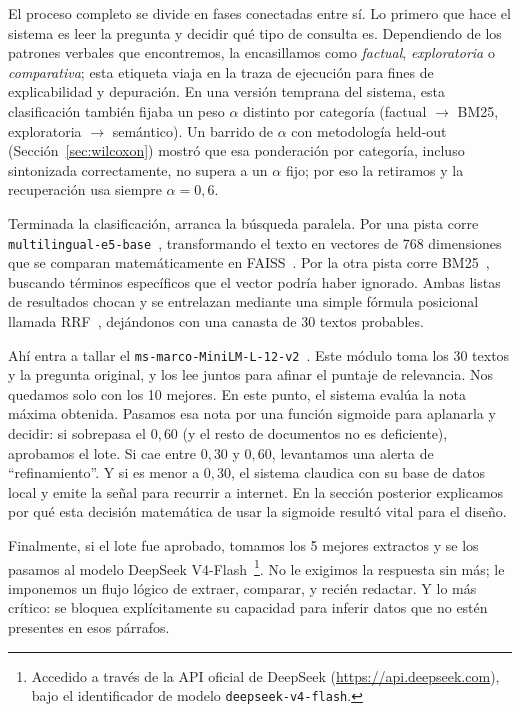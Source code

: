 \documentclass[runningheads]{llncs}
\begin{document}
El proceso completo se divide en fases conectadas entre s\'{i}. Lo primero que hace el sistema es leer la pregunta y decidir qu\'{e} tipo de consulta es. Dependiendo de los patrones verbales que encontremos, la encasillamos como \textit{factual}, \textit{exploratoria} o \textit{comparativa}; esta etiqueta viaja en la traza de ejecuci\'{o}n para fines de explicabilidad y depuraci\'{o}n. En una versi\'{o}n temprana del sistema, esta clasificaci\'{o}n tambi\'{e}n fijaba un peso $\alpha$ distinto por categor\'{i}a (factual $\rightarrow$ BM25, exploratoria $\rightarrow$ sem\'{a}ntico). Un barrido de $\alpha$ con metodolog\'{i}a held-out (Secci\'{o}n~\ref{sec:wilcoxon}) mostr\'{o} que esa ponderaci\'{o}n por categor\'{i}a, incluso sintonizada correctamente, no supera a un $\alpha$ fijo; por eso la retiramos y la recuperaci\'{o}n usa siempre $\alpha{=}0{,}6$.

Terminada la clasificaci\'{o}n, arranca la b\'{u}squeda paralela. Por una pista corre \texttt{multilingual-e5-base}~\cite{wang2024e5}, transformando el texto en vectores de 768 dimensiones que se comparan matem\'{a}ticamente en FAISS~\cite{johnson2021billion}. Por la otra pista corre BM25~\cite{robertson2009bm25}, buscando t\'{e}rminos espec\'{i}ficos que el vector podr\'{i}a haber ignorado. Ambas listas de resultados chocan y se entrelazan mediante una simple f\'{o}rmula posicional llamada RRF~\cite{cormack2009rrf}, dej\'{a}ndonos con una canasta de 30 textos probables.

Ah\'{i} entra a tallar el \texttt{ms-marco-MiniLM-L-12-v2}~\cite{nogueira2019passage}. Este m\'{o}dulo toma los 30 textos y la pregunta original, y los lee juntos para afinar el puntaje de relevancia. Nos quedamos solo con los 10 mejores. En este punto, el sistema eval\'{u}a la nota m\'{a}xima obtenida. Pasamos esa nota por una funci\'{o}n sigmoide para aplanarla y decidir: si sobrepasa el $0{,}60$ (y el resto de documentos no es deficiente), aprobamos el lote. Si cae entre $0{,}30$ y $0{,}60$, levantamos una alerta de ``refinamiento''. Y si es menor a $0{,}30$, el sistema claudica con su base de datos local y emite la se\~{n}al para recurrir a internet. En la secci\'{o}n posterior explicamos por qu\'{e} esta decisi\'{o}n matem\'{a}tica de usar la sigmoide result\'{o} vital para el dise\~{n}o.

Finalmente, si el lote fue aprobado, tomamos los 5 mejores extractos y se los pasamos al modelo DeepSeek V4-Flash~\cite{deepseek2026v4}\footnote{Accedido a trav\'{e}s de la API oficial de DeepSeek (\url{https://api.deepseek.com}), bajo el identificador de modelo \texttt{deepseek-v4-flash}.}. No le exigimos la respuesta sin m\'{a}s; le imponemos un flujo l\'{o}gico de extraer, comparar, y reci\'{e}n redactar. Y lo m\'{a}s cr\'{i}tico: se bloquea expl\'{i}citamente su capacidad para inferir datos que no est\'{e}n presentes en esos p\'{a}rrafos.
\end{document}

